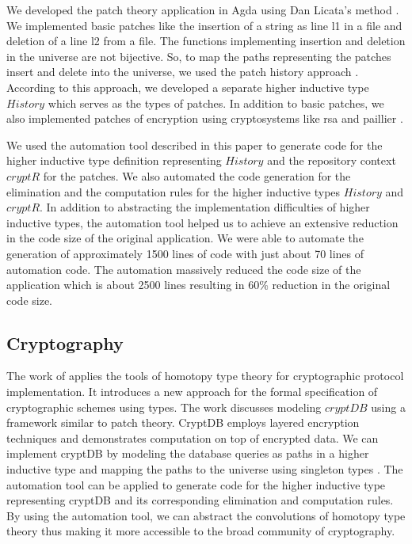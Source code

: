 \documentclass[sigplan,10pt]{acmart}
\begin{document}
We developed the patch theory application in Agda using Dan Licata's method \cite{Licata-2011}. We implemented basic patches like the insertion of a string as line l1 in a file and deletion of a line l2 from a file. The functions implementing insertion and deletion in the universe are not bijective. So, to map the paths representing the patches insert and delete into the universe, we used the patch history approach \cite{Angiuli-2014}. According to this approach, we developed a separate higher inductive type $History$ which serves as the types of patches. In addition to basic patches, we also implemented patches of encryption using cryptosystems like rsa \cite{Rivest-1978} and paillier \cite{Paillier-1999}.

We used the automation tool described in this paper to generate code for the higher inductive type definition representing $History$ and the repository context $cryptR$ for the patches. We also automated the code generation for the elimination and the computation rules for the higher inductive types $History$ and $cryptR$. In addition to abstracting the implementation difficulties of higher inductive types, the automation tool helped us to achieve an extensive reduction in the code size of the original application. We were able to automate the generation of approximately 1500 lines of code with just about 70 lines of automation code. The automation massively reduced the code size of the application which is about 2500 lines resulting in 60\% reduction in the original code size.

\subsection{Cryptography}
\label{crypto}

The work of \cite{Paventhan-2018} applies the tools of homotopy type theory for cryptographic protocol implementation. It introduces a new approach for the formal specification of cryptographic schemes using types. The work discusses modeling $cryptDB$ \citep{Popa-2011} using a framework similar to patch theory. CryptDB employs layered encryption techniques and demonstrates computation on top of encrypted data. We can implement cryptDB by modeling the database queries as paths in a higher inductive type and mapping the paths to the universe using singleton types \cite{Angiuli-2014}. The automation tool can be applied to generate code for the higher inductive type representing cryptDB and its corresponding elimination and computation rules. By using the automation tool, we can abstract the convolutions of homotopy type theory thus making it more accessible to the broad community of cryptography.
\end{document}
